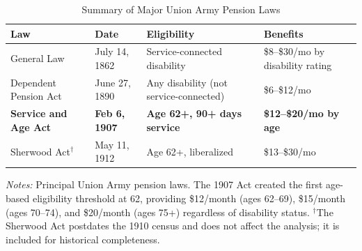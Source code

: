 \begin{table}[htbp]
\centering
\caption{Summary of Major Union Army Pension Laws}
\label{tab:pension_laws}
\begin{tabular}{lp{3cm}p{4cm}p{4cm}}
\toprule
  Law & Date & Eligibility & Benefits \\
\midrule
  General Law & July 14, 1862 & Service-connected disability & \$8--\$30/mo by disability rating \\
  Dependent Pension Act & June 27, 1890 & Any disability (not service-connected) & \$6--\$12/mo \\
  \textbf{Service and Age Act} & \textbf{Feb 6, 1907} & \textbf{Age 62+, 90+ days service} & \textbf{\$12--\$20/mo by age} \\
  Sherwood Act$^{\dagger}$ & May 11, 1912 & Age 62+, liberalized & \$13--\$30/mo \\
\bottomrule
\end{tabular}
\begin{tablenotes}[flushleft]
\small
\item \textit{Notes:} Principal Union Army pension laws. The 1907 Act created the first age-based eligibility threshold at 62, providing \$12/month (ages 62--69), \$15/month (ages 70--74), and \$20/month (ages 75+) regardless of disability status. $^{\dagger}$The Sherwood Act postdates the 1910 census and does not affect the analysis; it is included for historical completeness.
\end{tablenotes}
\end{table}
